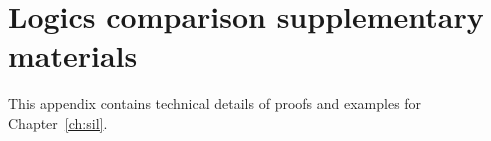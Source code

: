 
\chapter{Logics comparison supplementary materials}\label{ch:app:sil}
This appendix contains technical details of proofs and examples for Chapter~\ref{ch:sil}.
